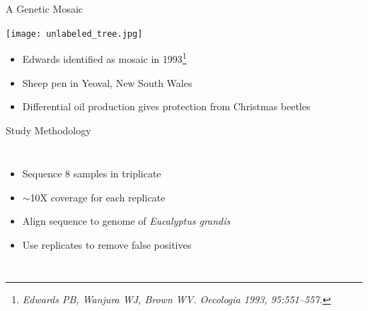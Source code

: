 \documentclass{beamer}
\begin{document}
\begin{frame}{A Genetic Mosaic}
	\begin{center}
	\texttt{[image: unlabeled\_tree.jpg]}
	\end{center}
	\begin{itemize}
		\item Edwards identified as mosaic in 1993\footnote{\textit{Edwards PB, Wanjura WJ, Brown WV. Oecologia 1993, 95:551–557.}}
		\item Sheep pen in Yeoval, New South Wales
		\item Differential oil production gives protection from Christmas beetles
	\end{itemize}
\end{frame}

\begin{frame}{Study Methodology}
\begin{columns}

\begin{itemize}
\item Sequence 8 samples in triplicate
\item $\sim$10X coverage for each replicate
\item Align sequence to genome of \textit{Eucalyptus grandis}
\item Use replicates to remove false positives
\end{itemize}

\begin{center}
\end{center}
\end{columns}
\end{frame}
\end{document}
